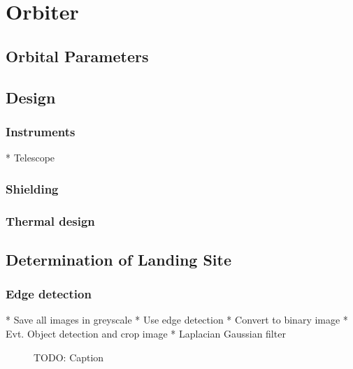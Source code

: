 \chapter{Orbiter}

\section{Orbital Parameters}

\section{Design}

\subsection{Instruments}

* Telescope

\subsection{Shielding}

\subsection{Thermal design}

\section{Determination of Landing Site}

\subsection{Edge detection} %

* Save all images in greyscale
* Use edge detection
* Convert to binary image
* Evt. Object detection and crop image
* Laplacian Gaussian filter

\begin{figure}[htb]
	\centering
	\caption{TODO: Caption}
	\label{fig:PIA01403}
\end{figure}

